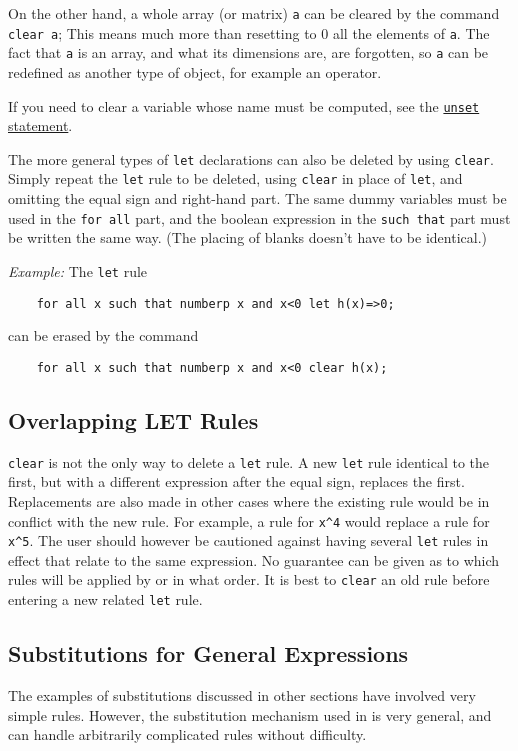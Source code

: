 On the other hand, a whole array (or matrix) \texttt{a} can be cleared by the
command \texttt{clear a};  This means much more than resetting to 0 all the
elements of \texttt{a}.  The fact that \texttt{a} is an array, and what its
dimensions are, are forgotten, so \texttt{a} can be redefined as another type
of object, for example an operator.

If you need to clear a variable whose name must be computed, see the
\hyperlink{command:UNSET}{\texttt{unset} statement}.

The more general types of \texttt{let} declarations can also be deleted by
using \texttt{clear}.  Simply repeat the \texttt{let} rule to be deleted, using
\texttt{clear} in place of \texttt{let}, and omitting the equal sign and
right-hand part.  The same dummy variables must be used in the
\texttt{for all} part, and the boolean expression in the \texttt{such that} part must be
written the same way. (The placing of blanks doesn't have to be
identical.)

\textit{Example:} The \texttt{let} rule
\begin{verbatim}
    for all x such that numberp x and x<0 let h(x)=>0;
\end{verbatim}
can be erased by the command
\begin{verbatim}
    for all x such that numberp x and x<0 clear h(x);
\end{verbatim}

\subsection{Overlapping LET Rules}
\texttt{clear} is not the only way to delete a \texttt{let} rule.  A new
\texttt{let} rule identical to the first, but with a different expression after
the equal sign, replaces the first.  Replacements are also made in other
cases where the existing rule would be in conflict with the new rule.  For
example, a rule for \texttt{x\textasciicircum 4} would replace a rule for
\texttt{x\textasciicircum 5}.
The user should however be cautioned against having several \texttt{let}
rules in effect that relate to the same expression.  No guarantee can be
given as to which rules will be applied by {\REDUCE} or in what order.  It
is best to \texttt{clear} an old rule before entering a new related
\texttt{let} rule.

\subsection{Substitutions for General Expressions}
\label{sec-gensubs}
The examples of substitutions discussed in other sections have involved
very simple rules. However, the substitution mechanism used in {\REDUCE} is
very general, and can handle arbitrarily complicated rules without
difficulty.

